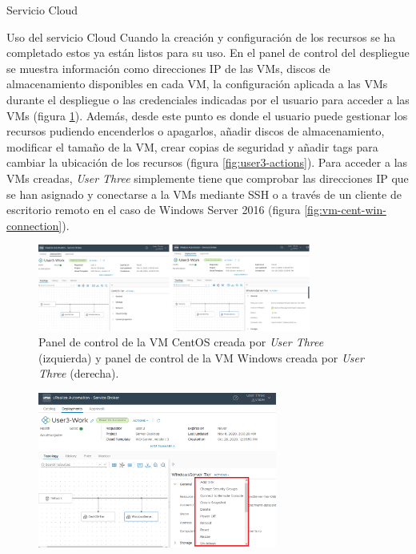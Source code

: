 \begin{subsection}{Servicio Cloud}
\begin{subsubsection}{Uso del servicio Cloud}
        Cuando la creación y configuración de los recursos se ha completado estos ya están listos para su uso. En el panel de control del despliegue se muestra información como direcciones IP de las VMs, discos de almacenamiento disponibles en cada VM, la configuración aplicada a las VMs durante el despliegue o las credenciales indicadas por el usuario para acceder a las VMs (figura \ref{fig:user3-panel-control}). Además, desde este punto es donde el usuario puede gestionar los recursos pudiendo encenderlos o apagarlos, añadir discos de almacenamiento, modificar el tamaño de la VM, crear copias de seguridad y añadir tags para cambiar la ubicación de los recursos (figura \ref{fig:user3-actions}). Para acceder a las VMs creadas, \textit{User Three} simplemente tiene que comprobar las direcciones IP que se han asignado y conectarse a la VMs mediante SSH o a través de un cliente de escritorio remoto en el caso de Windows Server 2016 (figura \ref{fig:vm-cent-win-connection}).
        \begin{figure}[h]
            \centering
            \includegraphics[width=0.8\textwidth]{imaxes/pruebaconcepto/vrealize/user3-info-centos.png}
            \caption{Panel de control de la VM CentOS creada por \textit{User Three} (izquierda) y panel de control de la VM Windows creada por \textit{User Three} (derecha).}
            \label{fig:user3-panel-control}
        \end{figure}
        \FloatBarrier
        \begin{figure}[h]
            \centering
            \includegraphics[width=0.7\textwidth]{imaxes/pruebaconcepto/vrealize/user3-vm-actions.png}

\end{figure}
\end{subsubsection}
\end{subsection}

